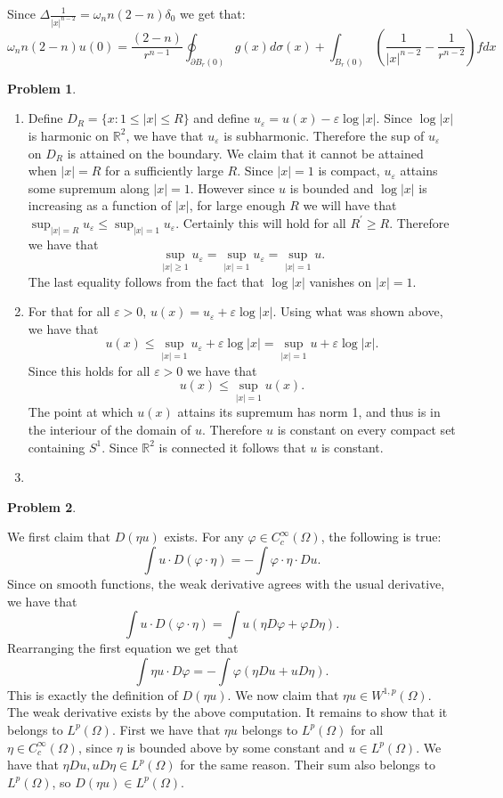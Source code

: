 \documentclass[12pt, a4paper]{article}
\newtheorem{problem}{Problem}
\theoremstyle{definition}
\newcommand{\penum}{ \begin{enumerate}[label=\bf(\alph*), leftmargin=0pt]}
\newcommand{\epenum}{ \end{enumerate} }
\newcommand{\R}{\mathbb{R}}                           %
\newcommand{\bd}{\partial}
\newcommand{\ep}{\varepsilon}
\begin{document}
Since $\Delta \frac{1}{|x|^{n-2}}= \omega_n n(2-n)\delta_0$ we get that:
$$\omega_n n(2-n) u(0) = \frac{(2-n)}{r^{n-1}} \oint_{\bd B_r(0)}g(x)d\sigma(x) + \int_{B_r(0)} \left( \frac{1}{|x|^{n-2}} - \frac{1}{r^{n-2}}\right) f dx  $$
\newpage
\begin{problem}
\end{problem}
\penum
\item Define $D_R = \{x:  1 \leq |x| \leq R\}$ and define $u_\ep  = u(x) - \ep \log|x|$.  Since $\log|x|$ is harmonic on $\R^2$, we have that $u_\ep$ is subharmonic. 
Therefore the sup of $u_\ep$ on $D_R$ is attained on the boundary. We claim that it cannot be attained when $|x| = R$ for a sufficiently large $R$. Since $|x|= 1$ is compact, $u_\ep$ attains some supremum along $|x|=1$. However since $u$ is bounded and $\log |x|$ is increasing as a function of $|x|$, for large enough $R$ we will have that $\sup_{|x| = R} u_\ep  \leq  \sup_{|x| = 1} u_\ep$. Certainly this will hold for all $R^\prime \geq R$. Therefore we have that 
$$\sup_{|x|\geq 1} u_\ep = \sup_{|x| = 1} u_\ep = \sup_{|x| = 1}u.$$
The last equality follows from the fact that $\log|x|$ vanishes on $|x|=1$. 
\item 
For that for all $\ep >0$, $u(x) = u_\ep + \ep \log |x|$. Using what was shown above, we have that 
$$u(x) \leq \sup_{|x| = 1} u_\ep + \ep \log |x| = \sup_{|x| = 1} u + \ep \log |x|. $$
Since this holds for all $\ep>0$ we have that 
$$u(x) \leq \sup_{|x| = 1} u(x).$$
The point at which $u(x)$ attains its supremum has norm 1, and thus is in the interiour of the domain of $u$. Therefore $u$ is constant on every compact set containing $S^1$. Since $\R^2$ is connected it follows that $u$ is constant. 
\item 
\epenum
\newpage
\begin{problem}
\end{problem}
We first claim that $D(\eta u)$ exists. For any $\varphi \in C_c^\infty(\Omega)$, the following is true: 
$$\int u \cdot D(\varphi \cdot \eta) = - \int \varphi \cdot \eta \cdot Du.$$
Since on smooth functions, the weak derivative agrees with the usual derivative, we have that $$\int u \cdot D(\varphi \cdot \eta) = \int u \left(\eta D\varphi + \varphi D \eta\right).$$
Rearranging the first equation we get that 
$$\int \eta u \cdot D\varphi = - \int\varphi \left( \eta Du + u D \eta \right).$$
This is exactly the definition of $D(\eta u)$. We now claim that $\eta u \in W^{1,p}(\Omega)$.
The weak derivative exists by the above computation. It remains to show that it belongs to $L^p(\Omega)$. First we have that $\eta u$ belongs to $L^p(\Omega)$ for all $\eta \in C_c^\infty(\Omega)$, since $\eta$ is bounded above by some constant and $u\in L^p(\Omega)$. We have that $\eta Du, u D\eta\in L^p(\Omega)$ for the same reason. Their sum also belongs to $L^p(\Omega)$, so $D(\eta u)\in L^p(\Omega)$. 
\end{document}
